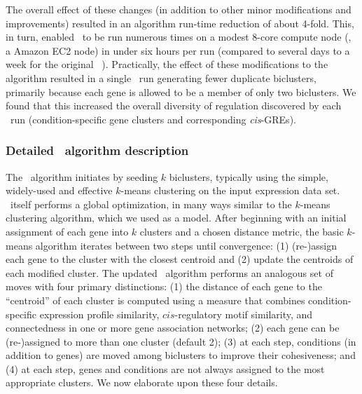 The overall effect of these changes (in addition to other minor
modifications and improvements) resulted in an algorithm run-time
reduction of about 4-fold. This, in turn, enabled \cm\ to be run
numerous times on a modest 8-core compute node (\eg, a
 Amazon EC2 node) in under six hours per 
run (compared to several days to a week for the original \cm\ ). Practically, the effect of these modifications to the algorithm
resulted in a single \cm\ run generating fewer duplicate
biclusters, primarily because each gene is allowed to be a member of
only two biclusters. We found that this increased the
overall diversity of regulation discovered by each \cm\ run (condition-specific gene clusters and
corresponding \textit{cis}-GREs).

\subsubsection{Detailed \cm\ algorithm description}

The \cm\ algorithm initiates by seeding $k$ biclusters, typically using
the simple, widely-used and effective $k$-means clustering on the
input expression data set. \cm\ itself performs a global optimization,
in many ways similar to the $k$-means clustering algorithm, which we
used as a model. After beginning with an initial assignment of each
gene into $k$ clusters and a chosen distance metric, the basic
$k$-means algorithm iterates between two steps until convergence: (1)
(re-)assign each gene to the cluster with the closest centroid and (2)
update the centroids of each modified cluster. The updated \cm\ 
algorithm performs an analogous set of moves with four primary
distinctions: (1) the distance of each gene to the ``centroid'' of
each cluster is computed using a measure that combines
condition-specific expression profile similarity, $cis$-regulatory
motif similarity, and connectedness in one or more gene association
networks; (2) each gene can be (re-)assigned to more than one cluster
(default 2); (3) at each step, conditions (in addition to genes) are
moved among biclusters to improve their cohesiveness; and (4) at each
step, genes and conditions are not always assigned to the most
appropriate clusters. We now elaborate upon these four details.


